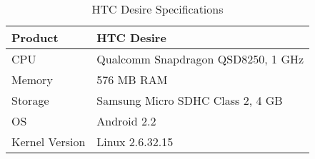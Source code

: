 \begin{table}
  \centering
  \caption{HTC Desire Specifications}
  \begin{tabular}{ | l | l |}
    \hline
    Product & HTC Desire                        \\ \hline
    CPU     & Qualcomm Snapdragon QSD8250, 1 GHz \\ \hline
    Memory  & 576 MB \ac{RAM}                   \\ \hline
    Storage & Samsung Micro SDHC Class 2, 4 GB  \\ \hline
    OS      & Android 2.2                     \\ \hline
    Kernel Version & Linux 2.6.32.15 \\ \hline
  \end{tabular}
  \label{tbl:device:desire}
\end{table}
